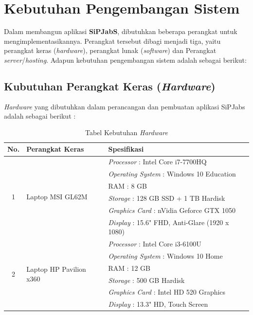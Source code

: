\newpage
\section{Kebutuhan Pengembangan Sistem}

Dalam membangun aplikasi \textbf{SiPJabS}, dibutuhkan beberapa perangkat untuk mengimplementasikannya. Perangkat tersebut dibagi menjadi tiga, yaitu perangkat keras (\textit{hardware}), perangkat lunak (\textit{software}) dan Perangkat \textit{server}/\textit{hosting}. Adapun kebutuhan pengembangan sistem adalah sebagai berikut: 

\subsection{Kubutuhan Perangkat Keras (\textit{Hardware}) }

\textit{Hardware} yang dibutuhkan dalam perancangan dan pembuatan aplikasi SiPJabs
adalah sebagai berikut :


\begin{table}[H]
	\centering
	\caption{Tabel Kebutuhan \textit{Hardware}}
	\begin{tabular}{ | c | l | p{75mm} | }
		\hline
		No. & Perangkat Keras & Spesifikasi \\
		\hline
		\multirow{6}{*}{1} & \multirow{6}{*}{Laptop MSI GL62M} & \textit{Processor} : Intel Core i7-7700HQ \\
		& & \textit{Operating System} : Windows 10 Education \\
		& & RAM : 8 GB \\
		& & \textit{Storage} : 128 GB SSD + 1 TB Hardisk \\
		& & \textit{Graphics Card} :  nVidia Geforce GTX 1050 \\
		& & \textit{Display} : 15.6" FHD, Anti-Glare (1920 x 1080) \\
		
		
		\hline
		
		\multirow{6}{*}{2} & \multirow{6}{*}{Laptop HP Pavilion x360} & \textit{Processor} : Intel Core i3-6100U \\
		& & \textit{Operating System} : Windows 10 Home \\
		& & RAM : 12 GB \\
		& & \textit{Storage} : 500 GB Hardisk\\
		& & \textit{Graphics Card} : Intel HD 520 Graphics \\
		& & \textit{Display} : 13.3" HD, Touch Screen \\
		
		\hline
	\end{tabular}
\end{table}


